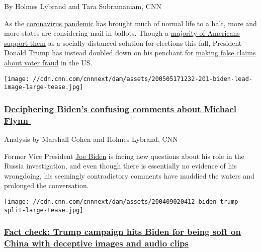 By Holmes Lybrand and Tara Subramaniam, CNN

As the
\href{https://www.cnn.com/us/live-news/us-coronavirus-update-05-27-20/index.html}{coronavirus
pandemic} has brought much of normal life to a halt, more and more
states are considering mail-in ballots. Though a
\href{https://www.cnn.com/2020/04/21/politics/mail-in-voting-partisan-divide/index.html}{majority
of Americans support them} as a socially distanced solution for
elections this fall, President Donald Trump has instead doubled down on
his penchant for
\href{https://www.cnn.com/2020/04/10/politics/fact-check-trump-lying-voter-fraud/index.html}{making
false claims about voter fraud} in the US.

\href{/2020/05/23/politics/joe-biden-comments-on-michael-flynn-donald-trump/index.html}{}

\texttt{[image: //cdn.cnn.com/cnnnext/dam/assets/200505171232-201-biden-lead-image-large-tease.jpg]}

\hypertarget{deciphering-bidens-confusing-comments-about-michael-flynn---}{%
\subsubsection{\texorpdfstring{\href{/2020/05/23/politics/joe-biden-comments-on-michael-flynn-donald-trump/index.html}{Deciphering
Biden's confusing comments about Michael Flynn\,\,
}}{Deciphering Biden's confusing comments about Michael Flynn\,\, }}\label{deciphering-bidens-confusing-comments-about-michael-flynn---}}

Analysis by Marshall Cohen and Holmes Lybrand, CNN

Former Vice President
\href{https://www.cnn.com/election/2020/candidate/biden}{Joe Biden} is
facing new questions about his role in the Russia investigation, and
even though there is essentially no evidence of his wrongdoing, his
seemingly contradictory comments have muddied the waters and prolonged
the conversation.

\href{/2020/04/10/politics/trump-campaign-ad-joe-biden-fact-check/index.html}{}

\texttt{[image: //cdn.cnn.com/cnnnext/dam/assets/200409020412-biden-trump-split-large-tease.jpg]}

\hypertarget{fact-check-trump-campaign-hits-biden-for-being-soft-on-china-with-deceptive-images-and-audio-clips}{%
\subsubsection{\texorpdfstring{\href{/2020/04/10/politics/trump-campaign-ad-joe-biden-fact-check/index.html}{Fact
check: Trump campaign hits Biden for being soft on China with deceptive
images and audio
clips}}{Fact check: Trump campaign hits Biden for being soft on China with deceptive images and audio clips}}\label{fact-check-trump-campaign-hits-biden-for-being-soft-on-china-with-deceptive-images-and-audio-clips}}


